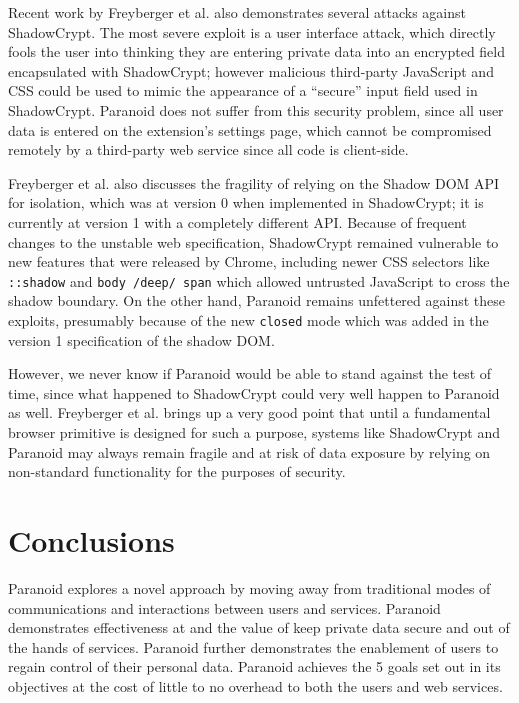 \documentclass[letterpaper,twocolumn,10pt]{article}
\begin{document}
Recent work by Freyberger et al. \cite{Freyberger2018} also demonstrates several attacks against ShadowCrypt. The most severe exploit is a user interface attack, which directly fools the user into thinking they are entering private data into an encrypted field encapsulated with ShadowCrypt; however malicious third-party JavaScript and CSS could be used to mimic the appearance of a ``secure'' input field used in ShadowCrypt. Paranoid does not suffer from this security problem, since all user data is entered on the extension's settings page, which cannot be compromised remotely by a third-party web service since all code is client-side.

Freyberger et al. also discusses the fragility of relying on the Shadow DOM API for isolation, which was at version 0 when implemented in ShadowCrypt; it is currently at version 1 with a completely different API. Because of frequent changes to the unstable web specification, ShadowCrypt remained vulnerable to new features that were released by Chrome, including newer CSS selectors like \texttt{::shadow} and \texttt{body /deep/ span} which allowed untrusted JavaScript to cross the shadow boundary. On the other hand, Paranoid remains unfettered against these exploits, presumably because of the new \texttt{closed} mode which was added in the version 1 specification of the shadow DOM.

However, we never know if Paranoid would be able to stand against the test of time, since what happened to ShadowCrypt could very well happen to Paranoid as well. Freyberger et al. brings up a very good point that until a fundamental browser primitive is designed for such a purpose, systems like ShadowCrypt and Paranoid may always remain fragile and at risk of data exposure by relying on non-standard functionality for the purposes of security.

\section{Conclusions}

Paranoid explores a novel approach by moving away from traditional modes of communications and interactions between users and services. Paranoid demonstrates effectiveness at and the value of keep private data secure and out of the hands of services. Paranoid further demonstrates the enablement of users to regain control of their personal data. Paranoid achieves the 5 goals set out in its objectives at the cost of little to no overhead to both the users and web services.





\end{document}
